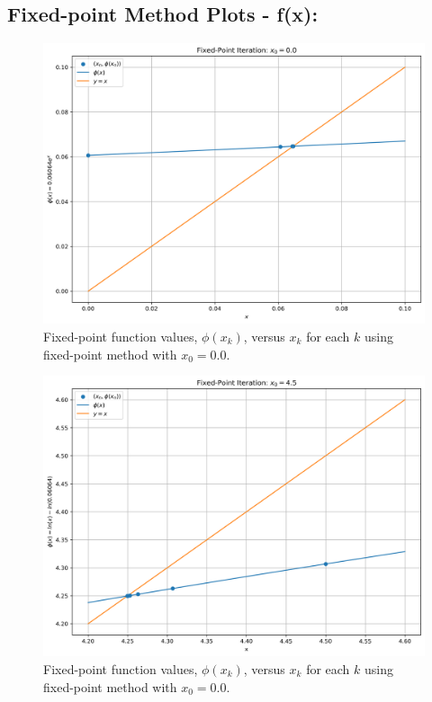 \documentclass[11pt]{article}
\begin{document}
\subsection{Fixed-point Method Plots - f(x):}

\begin{figure}[H]
	\centering
	\includegraphics[width=\linewidth]{../figures/Fixed_f_0.0}
	\caption{Fixed-point function values, $\phi(x_k)$, versus $x_k$ for each $k$ using fixed-point method with $x_0 = 0.0$.}
	\label{fig:fixed_f_0.0}
\end{figure}

\begin{figure}[H]
	\centering
	\includegraphics[width=\linewidth]{../figures/Fixed_f_4.5}
	\caption{Fixed-point function values, $\phi(x_k)$, versus $x_k$ for each $k$ using fixed-point method with $x_0 = 0.0$.}
	\label{fig:fixed_f_4.5}
\end{figure}
\end{document}
